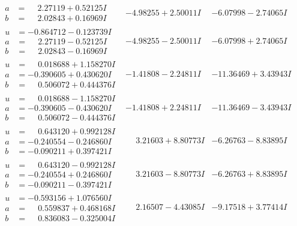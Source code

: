 \documentclass[1p]{elsarticle_modified}
\theoremstyle{definition}
\begin{document}
$$\begin{array}{c|c|c}
\begin{aligned}
a &= \phantom{-}2.27119 + 0.52125 I \\
b &= \phantom{-}2.02843 + 0.16969 I\end{aligned}
 & -4.98255 + 2.50011 I & -6.07998 - 2.74065 I \\ \hline\begin{aligned}
u &= -0.864712 - 0.123739 I \\
a &= \phantom{-}2.27119 - 0.52125 I \\
b &= \phantom{-}2.02843 - 0.16969 I\end{aligned}
 & -4.98255 - 2.50011 I & -6.07998 + 2.74065 I \\ \hline\begin{aligned}
u &= \phantom{-}0.018688 + 1.158270 I \\
a &= -0.390605 + 0.430620 I \\
b &= \phantom{-}0.506072 + 0.444376 I\end{aligned}
 & -1.41808 - 2.24811 I & -11.36469 + 3.43943 I \\ \hline\begin{aligned}
u &= \phantom{-}0.018688 - 1.158270 I \\
a &= -0.390605 - 0.430620 I \\
b &= \phantom{-}0.506072 - 0.444376 I\end{aligned}
 & -1.41808 + 2.24811 I & -11.36469 - 3.43943 I \\ \hline\begin{aligned}
u &= \phantom{-}0.643120 + 0.992128 I \\
a &= -0.240554 - 0.246860 I \\
b &= -0.090211 + 0.397421 I\end{aligned}
 & \phantom{-}3.21603 + 8.80773 I & -6.26763 - 8.83895 I \\ \hline\begin{aligned}
u &= \phantom{-}0.643120 - 0.992128 I \\
a &= -0.240554 + 0.246860 I \\
b &= -0.090211 - 0.397421 I\end{aligned}
 & \phantom{-}3.21603 - 8.80773 I & -6.26763 + 8.83895 I \\ \hline\begin{aligned}
u &= -0.593156 + 1.076560 I \\
a &= \phantom{-}0.559837 + 0.468168 I \\
b &= \phantom{-}0.836083 - 0.325004 I\end{aligned}
 & \phantom{-}2.16507 - 4.43085 I & -9.17518 + 3.77414 I \\ \hline\begin{aligned}

\end{aligned}
\end{array}$$
\end{document}
